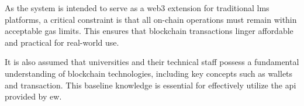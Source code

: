 As the system is intended to serve as a \Gls{web3} extension for traditional \acrshort{lms} platforms, a critical constraint is that all on-chain operations must remain within acceptable gas limits. This ensures that blockchain transactions linger affordable and practical for real-world use.

It is also assumed that universities and their technical staff possess a fundamental understanding of blockchain technologies, including key concepts such as wallets and transaction. This baseline knowledge is essential for effectively utilize the \acrshort{api} provided by \acrshort{ew}.